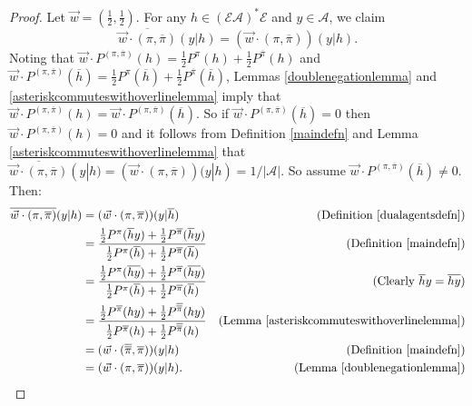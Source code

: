 \documentclass[twoside]{article}
\begin{document}
\begin{proof}
    Let $\vec w=(\frac12,\frac12)$.
    For any $h\in(\mathcal E\mathcal A)^*\mathcal E$ and $y\in\mathcal A$,
    we claim
    \[
        \overline{\vec w\cdot(\pi,\overline{\pi})}(y|h)
        =(\vec w\cdot(\pi,\overline{\pi}))(y|h).
    \]
    Noting that
    $\vec w\cdot P^{(\pi,\overline{\pi})}(h)
    =\frac12P^\pi(h)+\frac12P^{\overline\pi}(h)$
    and
    $\vec w\cdot P^{(\pi,\overline{\pi})}(\overline h)
    =\frac12P^\pi(\overline h)+\frac12P^{\overline\pi}(\overline h)$,
    Lemmas \ref{doublenegationlemma} and \ref{asteriskcommuteswithoverlinelemma}
    imply that
    $\vec w\cdot P^{(\pi,\overline{\pi})}(h)
    =\vec w\cdot P^{(\pi,\overline{\pi})}(\overline h)$.
    So if
    $\vec w\cdot P^{(\pi,\overline{\pi})}(\overline h)=0$
    then $\vec w\cdot P^{(\pi,\overline{\pi})}(h)=0$
    and it follows from
    Definition \ref{maindefn}
    and Lemma \ref{asteriskcommuteswithoverlinelemma} that
    $\overline{\vec w\cdot(\pi,\overline{\pi})}(y|h)
    =(\vec w\cdot(\pi,\overline{\pi}))(y|h)=1/|\mathcal A|$.
    So assume $\vec w\cdot P^{(\pi,\overline{\pi})}(\overline h)\not=0$.
    Then:
    \begin{align*}
        \overline{\vec w\cdot(\pi,\overline{\pi})}(y|h)
        &= (\vec w\cdot(\pi,\overline{\pi}))(y|\overline h)
            &\mbox{(Definition \ref{dualagentsdefn})}\\
        &= \frac
            {\frac12P^\pi(\overline hy)+\frac12P^{\overline\pi}(\overline hy)}
            {\frac12P^\pi(\overline h)+\frac12P^{\overline\pi}(\overline h)}
            &\mbox{(Definition \ref{maindefn})}\\
        &= \frac
            {\frac12P^\pi(\overline{hy})+\frac12P^{\overline\pi}(\overline{hy})}
            {\frac12P^\pi(\overline h)+\frac12P^{\overline\pi}(\overline h)}
            &\mbox{(Clearly $\overline hy=\overline{hy}$)}\\
        &= \frac
            {\frac12P^{\overline\pi}(hy)+\frac12P^{\overline{\overline\pi}}(hy)}
            {\frac12P^{\overline\pi}(h)+\frac12P^{\overline{\overline\pi}}(h)}
            &\mbox{(Lemma \ref{asteriskcommuteswithoverlinelemma})}\\
        &= (\vec w\cdot(\overline{\overline\pi},\overline\pi))(y|h)
            &\mbox{(Definition \ref{maindefn})}\\
        &= (\vec w\cdot(\pi,\overline\pi))(y|h).
            &\mbox{(Lemma \ref{doublenegationlemma})}
    \end{align*}
\end{proof}
\end{document}
